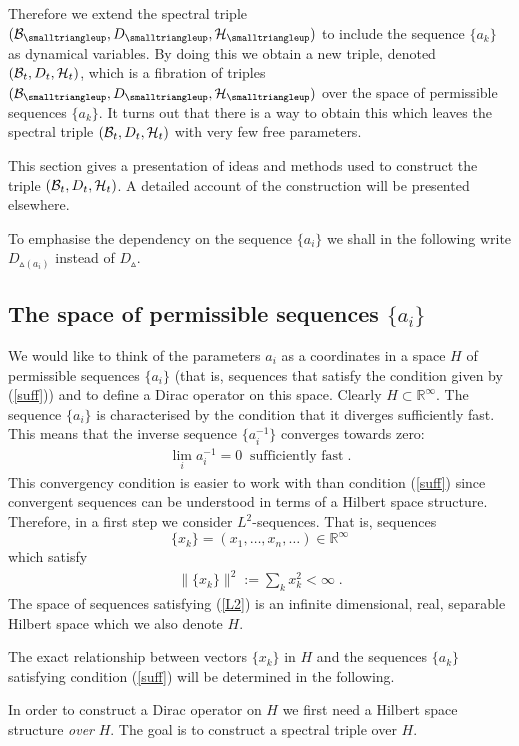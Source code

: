 \documentclass[12pt]{article}
\newcommand{\ba}{\begin{eqnarray}}
\newcommand{\ea}{\end{eqnarray}}
\def\cb{{\cal B}}
\def\ch{{\cal H}}
\begin{document}
Therefore we extend the spectral triple $(\cb_{\smalltriangleup},D_{\smalltriangleup},\ch_\smalltriangleup)$ to include the sequence $\{a_k\}$ as dynamical variables. By doing this we obtain a new triple, denoted $(\cb_t,D_t,\ch_t)$, which is a fibration of triples $(\cb_{\smalltriangleup},D_{\smalltriangleup},\ch_\smalltriangleup)$ over the space of permissible sequences $\{a_k\}$. It turns out that there is a way to obtain this which leaves the spectral triple $(\cb_t,D_t,\ch_t)$ with very few free parameters.

This section gives a presentation of ideas and methods used to construct the triple $(\cb_t,D_t,\ch_t)$. A detailed account of the construction will be presented elsewhere.

To emphasise the dependency on the sequence $\{a_i\}$ we shall in the following write $D_{\smalltriangleup(a_i)}$ instead of $D_{\smalltriangleup}$.






\subsection{The space of permissible sequences $\{a_i\}$}

We would like to think of the parameters $a_i$ as a coordinates in a space $H$ of permissible sequences $\{a_i\}$ (that is, sequences that satisfy the condition given by (\ref{suff})) and to define a Dirac operator on this space. Clearly $H\subset \mathbb{R}^\infty$. The sequence $\{a_i\}$ is characterised by the condition that it diverges sufficiently fast. This means that the inverse sequence $\{a_i^{-1}\}$ converges towards zero:
\ba 
\lim_i a_i^{-1}=0 \;\;\mbox{sufficiently fast}\;.
\label{Con1}
\ea
This convergency condition is easier to work with than condition (\ref{suff}) since convergent sequences can be understood in terms of a Hilbert space structure. Therefore, in a first step we consider $L^2$-sequences. That is, sequences 
\[
\{x_k\}=(x_1,\ldots,x_n,\ldots)\in \mathbb{R^\infty}
\]
which satisfy
\ba 
\|\{x_k\}\|^2 := \sum_k x_k^2 <\infty\;.
\label{L2}
\ea
The space of sequences satisfying (\ref{L2}) is an infinite dimensional, real, separable Hilbert space which we also denote $H$.

The exact relationship between vectors $\{x_k\}$ in $H$ and the sequences $\{a_k\}$ satisfying condition (\ref{suff}) will be determined in the following.


In order to construct a Dirac operator on $H$ we first need a Hilbert space structure {\it over} $H$. The goal is to construct a spectral triple over $H$. 
\end{document}
